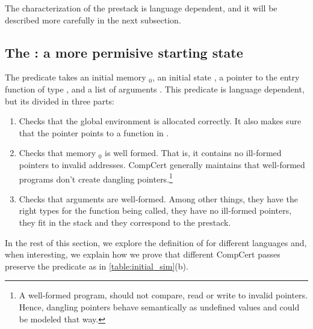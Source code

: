 The  characterization of the prestack is language dependent, and it will be described more carefully in the next subsection. %

\subsection{The : a more permisive starting state}\label{sec:entry_point}
The predicate  takes an initial memory $_0$, an initial state , a pointer to the entry function  of type , and a list of arguments . This predicate is language dependent, but its divided in three parts:
\begin{enumerate}
\item Checks that the global environment  is allocated correctly. It also makes sure that the pointer  points to a function in .
\item Checks that memory  $_0$ is well formed. That is, it contains no ill-formed pointers to invalid addresses. CompCert generally maintains that well-formed programs don't create dangling pointers.\footnote{A well-formed program, should not compare, read or write to invalid pointers. Hence, dangling pointers behave semantically as undefined values and could be modeled that way.}
\item Checks that arguments are well-formed. Among other things, they have the right types for the function being called, they have no ill-formed pointers, they fit in the stack and they correspond to the prestack.  
\end{enumerate}
In the rest of this section, we explore the definition of  for different languages and, when interesting, we explain how we prove that different CompCert passes preserve the predicate as in \autoref{table:initial_sim}(b).

